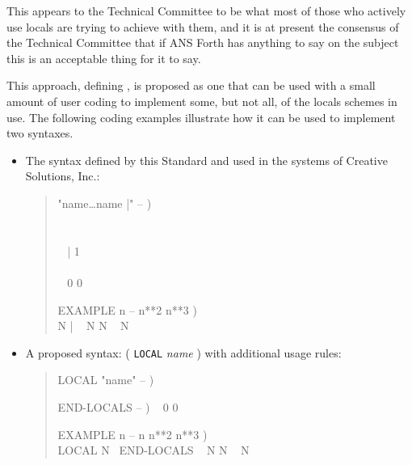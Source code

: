 \begin{intro}
This appears to the Technical Committee to be what most of those who
actively use locals are trying to achieve with them, and it is at
present the consensus of the Technical Committee that if ANS Forth has
anything to say on the subject this is an acceptable thing for it to
say.

This approach, defining , is proposed as one that can be
used with a small amount of user coding to implement some, but not all,
of the locals schemes in use. The following coding examples illustrate
how it can be used to implement two syntaxes.

\begin{itemize}
\item The syntax defined by this Standard and used in the systems of
	Creative Solutions, Inc.:

	\begin{quote}\ttfamily
	\word{:}   "name{\ldots}name |" -- ) \\
	\tab {} \\
	\tab~   ~    \\
	\tab~ \word{[CHAR]} | \word{-}  1 \word{-}  ~  \\
	\tab~  \\
	\tab {}  ~ 0 0  \\
	\word{;} 

	\word{:} EXAMPLE  n -- n**2 n**3 ) \\
	\tab {} N |
		~ N  N \word{*} ~ N \word{*}
	\word{;}
	\end{quote}

\item A proposed syntax: ( \texttt{LOCAL} \emph{name} ) with
	additional usage rules:

	\begin{quote}\ttfamily
	\word{:} LOCAL  "name" -- )
		   
	\word{;} ~

	\word{:} END-LOCALS  -- ) ~ 0 0 
	\word{;} ~

	\word{:} EXAMPLE  n -- n n**2 n**3 ) \\
	\tab LOCAL N ~END-LOCALS ~
		N  N \word{*} ~  N \word{*}
	\word{;}
	\end{quote}
\end{itemize}


\end{intro}
